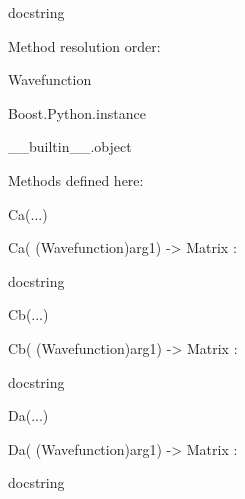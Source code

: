 \documentclass[letterpaper,10pt,english]{sphinxmanual}
\begin{document}
\begin{description}
\begin{description}
\item[{class Wavefunction(Boost.Python.instance)}] \leavevmode
\begin{DUlineblock}{0em}
\item[] docstring
\item[] 
\item[] Method resolution order:
\item[]
\begin{DUlineblock}{\DUlineblockindent}
\item[] Wavefunction
\item[] Boost.Python.instance
\item[] \_\_builtin\_\_.object
\item[] 
\end{DUlineblock}
\item[] Methods defined here:
\item[] 
\item[] Ca(...)
\item[]
\begin{DUlineblock}{\DUlineblockindent}
\item[] Ca( (Wavefunction)arg1) -\textgreater{} Matrix :
\item[]
\begin{DUlineblock}{\DUlineblockindent}
\item[] docstring
\item[] 
\end{DUlineblock}
\end{DUlineblock}
\item[] Cb(...)
\item[]
\begin{DUlineblock}{\DUlineblockindent}
\item[] Cb( (Wavefunction)arg1) -\textgreater{} Matrix :
\item[]
\begin{DUlineblock}{\DUlineblockindent}
\item[] docstring
\item[] 
\end{DUlineblock}
\end{DUlineblock}
\item[] Da(...)
\item[]
\begin{DUlineblock}{\DUlineblockindent}
\item[] Da( (Wavefunction)arg1) -\textgreater{} Matrix :
\item[]
\begin{DUlineblock}{\DUlineblockindent}
\item[] docstring

\end{DUlineblock}
\end{DUlineblock}
\end{DUlineblock}
\end{description}
\end{description}
\end{document}
